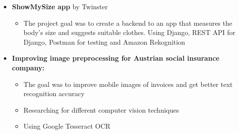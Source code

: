 \documentclass[10pt,a4paper,ragged2e,withhyper, normalphoto]{altacv}
\begin{document}
\begin{paracol}{2}
\begin{itemize}
\begin{itemize}
        \end{itemize}
        \item \textcolor{DarkPastelRed}{\textbf{ShowMySize app} by Twinster}
        \begin{itemize}
            \item The project goal was to create a backend to an app that measures the body's size and suggests suitable clothes. Using Django, REST API for Django, Postman for testing and Amazon Rekognition
        \end{itemize}
        \item \textbf{\textcolor{DarkPastelRed}{Improving image preprocessing for Austrian social insurance company:}}
        \begin{itemize}
            \item The goal was to improve mobile images of invoices and get better text recognition accuracy 
            \item Researching for different computer vision techniques
            \item Using Google Tesseract OCR
        \end{itemize}
    \end{itemize}
    

\end{paracol}
\end{document}
